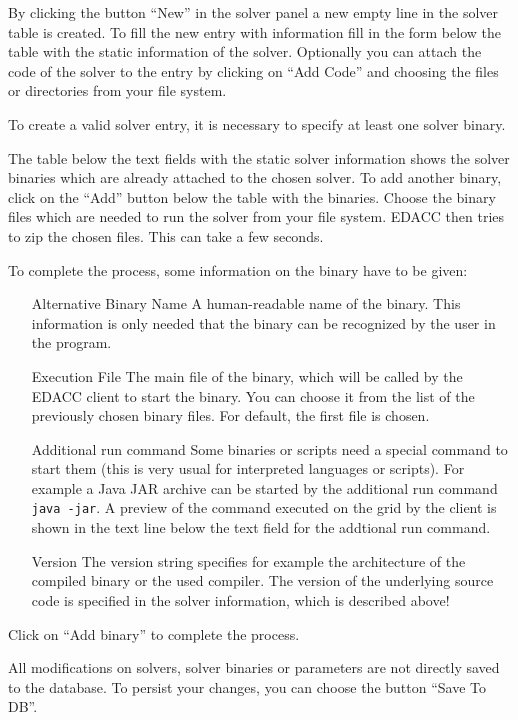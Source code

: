 By clicking the button ``New'' in the solver panel a new empty line in the solver table is created. To fill the new entry with information fill in the form below the table with the static information of the solver. Optionally you can attach the code of the solver to the entry by clicking on ``Add Code'' and choosing the files or directories from your file system. 

\attention To create a valid solver entry, it is necessary to specify at least one solver binary.

The table below the text fields with the static solver information shows the solver binaries which are already attached to the chosen solver. To add another binary, click on the ``Add'' button below the table with the binaries. Choose the binary files which are needed to run the solver from your file system. EDACC then tries to zip the chosen files. This can take a few seconds. 

To complete the process, some information on the binary have to be given:
\begin{itemize}
 \item[Alternative Binary Name] A human-readable name of the binary. This information is only needed that the binary can be recognized by the user in the program.
 \item[Execution File] The main file of the binary, which will be called by the EDACC client to start the binary. You can choose it from the list of the previously chosen binary files. For default, the first file is chosen.
 \item[Additional run command] Some binaries or scripts need a special command to start them (this is very usual for interpreted languages or scripts). For example a Java JAR archive can be started by the additional run command \verb|java -jar|. A preview of the command executed on the grid by the client is shown in the text line below the text field for the addtional run command.
 \item[Version] The version string specifies for example the architecture of the compiled binary or the used compiler. The version of the underlying source code is specified in the solver information, which is described above!
\end{itemize}

Click on ``Add binary'' to complete the process.

\attention All modifications on solvers, solver binaries or parameters are not directly saved to the database. To persist your changes, you can choose the button ``Save To DB''.

